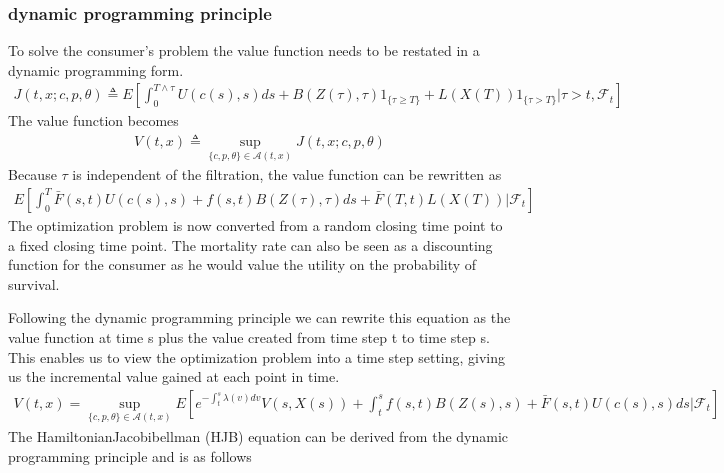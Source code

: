 \documentclass[letterpaper,10pt,english]{jupyterBook}
\begin{document}
\subsubsection{dynamic programming principle}
\label{\detokenize{Financial_application:dynamic-programming-principle}}
\sphinxAtStartPar
To solve the consumer’s problem the value function needs to be restated in a dynamic programming form.
\begin{equation*}
\begin{split}J(t, x; c, p, \theta) \triangleq E \left[\int_0^{T \wedge \tau} U(c(s),s)ds + B(Z(\tau),\tau)1_{\{\tau \ge T\}} + L(X(T))1_{\{\tau>T\}}| \tau> t, \mathcal{F}_t \right] \end{split}
\end{equation*}
\sphinxAtStartPar
The value function becomes
\begin{equation*}
\begin{split} V(t,x) \triangleq \sup_{\{c,p,\theta\} \in \mathcal{A}(t,x)} J(t, x; c, p, \theta)  \end{split}
\end{equation*}
\sphinxAtStartPar
Because \(\tau\) is independent of the filtration, the value function can be rewritten as
\begin{equation*}
\begin{split} E \left[\int_0^T  \bar{F}(s,t)U(c(s),s) + f(s,t)B(Z(\tau),\tau) ds  + \bar{F}(T,t)L(X(T))| \mathcal{F}_t \right]\end{split}
\end{equation*}
\sphinxAtStartPar
The optimization problem is now converted from a random  closing time point to a fixed closing time point. The mortality rate can also be seen as a discounting function for the consumer as he would value the utility on the probability of survival.

\sphinxAtStartPar
Following the dynamic programming principle we can rewrite this equation as the value function at time s plus the value created from time step t to time step s. This enables us to view the optimization problem into a time step setting, giving us the incremental value gained at each point in time.
\begin{equation*}
\begin{split} V(t,x) = \sup_{\{c,p,\theta\} \in \mathcal{A}(t,x)} E\left[e^{-\int_t^s\lambda(v)dv}V(s,X(s)) + \int_t^s f(s,t)B(Z(s),s) + \bar{F}(s,t)U(c(s),s)ds|\mathcal{F}_t\right] \end{split}
\end{equation*}
\sphinxAtStartPar
The Hamiltonian\sphinxhyphen{}Jacobi\sphinxhyphen{}bellman (HJB) equation can be derived from the dynamic programming principle and is as follows
\end{document}
